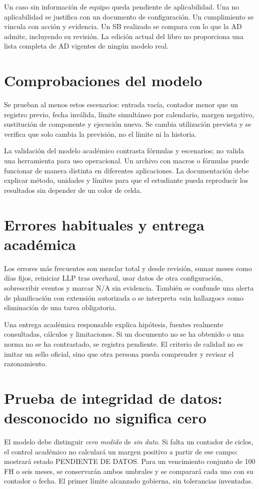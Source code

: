 Un caso sin información de equipo queda pendiente de aplicabilidad. Una no aplicabilidad se justifica con un documento de configuración. Un cumplimiento se vincula con acción y evidencia. Un SB realizado se compara con lo que la AD admite, incluyendo su revisión. La edición actual del libro no proporciona una lista completa de AD vigentes de ningún modelo real.
\section{Comprobaciones del modelo}
Se prueban al menos estos escenarios: entrada vacía, contador menor que un registro previo, fecha inválida, límite simultáneo por calendario, margen negativo, sustitución de componente y ejecución nueva. Se cambia utilización prevista y se verifica que solo cambia la previsión, no el límite ni la historia.

La validación del modelo académico contrasta fórmulas y escenarios; no valida una herramienta para uso operacional. Un archivo con macros o fórmulas puede funcionar de manera distinta en diferentes aplicaciones. La documentación debe explicar método, unidades y límites para que el estudiante pueda reproducir los resultados sin depender de un color de celda.
\section{Errores habituales y entrega académica}
Los errores más frecuentes son mezclar total y desde revisión, sumar meses como días fijos, reiniciar LLP tras overhaul, usar datos de otra configuración, sobrescribir eventos y marcar N/A sin evidencia. También se confunde una alerta de planificación con extensión autorizada o se interpreta «sin hallazgos» como eliminación de una tarea obligatoria.

Una entrega académica responsable explica hipótesis, fuentes realmente consultadas, cálculos y limitaciones. Si un documento no se ha obtenido o una norma no se ha contrastado, se registra pendiente. El criterio de calidad no es imitar un sello oficial, sino que otra persona pueda comprender y revisar el razonamiento.
\section{Prueba de integridad de datos: desconocido no significa cero}
El modelo debe distinguir \emph{cero medido} de \emph{sin dato}. Si falta un contador de ciclos, el control académico no calculará un margen positivo a partir de ese campo: mostrará estado PENDIENTE DE DATOS. Para un vencimiento conjunto de 100 FH o seis meses, se conservarán ambos umbrales y se comparará cada uno con su contador o fecha. El primer límite alcanzado gobierna, sin tolerancias inventadas.

